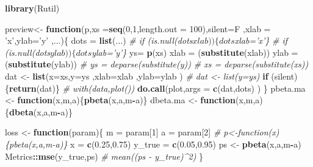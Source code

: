 \documentclass[]{article}
\newenvironment{Shaded}{\begin{snugshade}}{\end{snugshade}}
\newcommand{\KeywordTok}[1]{\textcolor[rgb]{0.13,0.29,0.53}{\textbf{#1}}}
\newcommand{\DataTypeTok}[1]{\textcolor[rgb]{0.13,0.29,0.53}{#1}}
\newcommand{\DecValTok}[1]{\textcolor[rgb]{0.00,0.00,0.81}{#1}}
\newcommand{\FloatTok}[1]{\textcolor[rgb]{0.00,0.00,0.81}{#1}}
\newcommand{\StringTok}[1]{\textcolor[rgb]{0.31,0.60,0.02}{#1}}
\newcommand{\CommentTok}[1]{\textcolor[rgb]{0.56,0.35,0.01}{\textit{#1}}}
\newcommand{\ControlFlowTok}[1]{\textcolor[rgb]{0.13,0.29,0.53}{\textbf{#1}}}
\newcommand{\OperatorTok}[1]{\textcolor[rgb]{0.81,0.36,0.00}{\textbf{#1}}}
\newcommand{\NormalTok}[1]{#1}
\theoremstyle{definition}
\theoremstyle{definition}
\theoremstyle{definition}
\theoremstyle{remark}
\begin{document}
\begin{Shaded}
\begin{Highlighting}[]
\KeywordTok{library}\NormalTok{(Rutil)}

\NormalTok{preview<-}\StringTok{ }\ControlFlowTok{function}\NormalTok{(p,}\DataTypeTok{xs =}\KeywordTok{seq}\NormalTok{(}\DecValTok{0}\NormalTok{,}\DecValTok{1}\NormalTok{,}\DataTypeTok{length.out =} \DecValTok{100}\NormalTok{),}\DataTypeTok{silent=}\NormalTok{F}
\NormalTok{                   ,}\DataTypeTok{xlab =} \StringTok{'x'}\NormalTok{,}\DataTypeTok{ylab=}\StringTok{'y'}
\NormalTok{                   ,...)\{}
\NormalTok{  dots =}\StringTok{ }\KeywordTok{list}\NormalTok{(...)}
  \CommentTok{# if (is.null(dots$xlab))\{ dots$xlab='x'\}}
  \CommentTok{# if (is.null(dots$ylab))\{ dots$ylab='y'\}}
\NormalTok{  ys=}\StringTok{ }\KeywordTok{p}\NormalTok{(xs)}
\NormalTok{  xlab =}\StringTok{ }\NormalTok{(}\KeywordTok{substitute}\NormalTok{(xlab))}
\NormalTok{  ylab =}\StringTok{ }\NormalTok{(}\KeywordTok{substitute}\NormalTok{(ylab))}
  \CommentTok{# ys = deparse(substitute(y))}
  \CommentTok{# xs = deparse(substitute(xs))}
\NormalTok{  dat <-}\StringTok{ }\KeywordTok{list}\NormalTok{(}\DataTypeTok{x=}\NormalTok{xs,}\DataTypeTok{y=}\NormalTok{ys}
\NormalTok{              ,}\DataTypeTok{xlab=}\NormalTok{xlab}
\NormalTok{              ,}\DataTypeTok{ylab=}\NormalTok{ylab}
\NormalTok{  )}
  \CommentTok{# dat <- list(y=ys)}
  \ControlFlowTok{if}\NormalTok{ (silent) \{}\KeywordTok{return}\NormalTok{(dat)\}}
  \CommentTok{# with(data,plot())}
  \KeywordTok{do.call}\NormalTok{(plot,}\DataTypeTok{args =} \KeywordTok{c}\NormalTok{(dat,dots) )}
\NormalTok{\}}
\NormalTok{pbeta.ma <-}\StringTok{ }\ControlFlowTok{function}\NormalTok{(x,m,a)\{}\KeywordTok{pbeta}\NormalTok{(x,a,m}\OperatorTok{-}\NormalTok{a)\}}
\NormalTok{dbeta.ma <-}\StringTok{ }\ControlFlowTok{function}\NormalTok{(x,m,a)\{}\KeywordTok{dbeta}\NormalTok{(x,a,m}\OperatorTok{-}\NormalTok{a)\}}

\NormalTok{loss <-}\StringTok{ }\ControlFlowTok{function}\NormalTok{(param)\{}
\NormalTok{  m =}\StringTok{ }\NormalTok{param[}\DecValTok{1}\NormalTok{]}
\NormalTok{  a =}\StringTok{ }\NormalTok{param[}\DecValTok{2}\NormalTok{]}
  \CommentTok{# p<-function(x) \{pbeta(x,a,m-a)\}}
\NormalTok{  x =}\StringTok{ }\KeywordTok{c}\NormalTok{(}\FloatTok{0.25}\NormalTok{,}\FloatTok{0.75}\NormalTok{)}
\NormalTok{  y_true =}\StringTok{ }\KeywordTok{c}\NormalTok{(}\FloatTok{0.05}\NormalTok{,}\FloatTok{0.95}\NormalTok{) }
\NormalTok{  ps <-}\StringTok{ }\KeywordTok{pbeta}\NormalTok{(x,a,m}\OperatorTok{-}\NormalTok{a)}
\NormalTok{  Metrics}\OperatorTok{::}\KeywordTok{mse}\NormalTok{(y_true,ps)}
  \CommentTok{# mean((ps - y_true)^2)}
\NormalTok{\}}



\end{Highlighting}
\end{Shaded}
\end{document}
